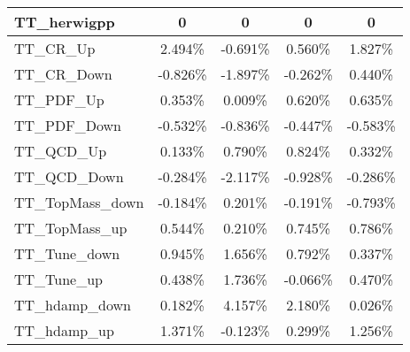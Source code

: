 \begin{table}[]
{\begin{tabular}{|l|c|c|c|c|}
TT\_herwigpp                      & 0                       & 0                       & 0                      & 0                       \\ \hline         
TT\_CR\_Up                        & 2.494\%                           & -0.691\%                          & 0.560\%                         & 1.827\%                          \\ \hline        
TT\_CR\_Down                      & -0.826\%                         & -1.897\%                        & -0.262\%                       & 0.440\%                        \\ \hline        
TT\_PDF\_Up                        & 0.353\%                         & 0.009\%                         & 0.620\%                        & 0.635\%                       \\ \hline    
TT\_PDF\_Down                      & -0.532\%                       & -0.836\%                       & -0.447\%                      & -0.583\%                       \\ \hline    
TT\_QCD\_Up                        & 0.133\%                         & 0.790\%                         & 0.824\%                        & 0.332\%                       \\ \hline    
TT\_QCD\_Down                      & -0.284\%                       & -2.117\%                       & -0.928\%                      & -0.286\%                       \\ \hline    
TT\_TopMass\_down                      & -0.184\%                       & 0.201\%                       & -0.191\%                      & -0.793\%                       \\ \hline    
TT\_TopMass\_up                      & 0.544\%                       & 0.210\%                       & 0.745\%                      & 0.786\%                       \\ \hline        
TT\_Tune\_down            & 0.945\%             & 1.656\%             & 0.792\%            & 0.337\%             \\ \hline      
TT\_Tune\_up              & 0.438\%               & 1.736\%               & -0.066\%              & 0.470\%               \\ \hline    
TT\_hdamp\_down                  & 0.182\%                         & 4.157\%                      & 2.180\%                        & 0.026\%                   \\ \hline
TT\_hdamp\_up                    & 1.371\%                           & -0.123\%                        & 0.299\%                          & 1.256\%                     \\ \hline

\end{tabular}}
\end{table}
